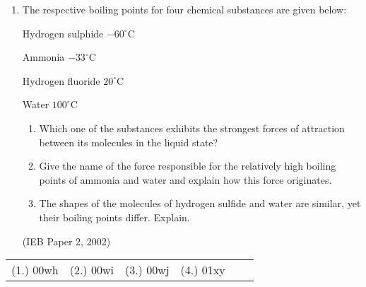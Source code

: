 \begin{eocexercises}{}
\begin{enumerate}
\item{The respective boiling points for four chemical substances are given below:

Hydrogen sulphide $-60^{\circ}$C

Ammonia $-33^{\circ}$C

Hydrogen fluoride $20^{\circ}$C

Water $100^{\circ}$C

\begin{enumerate}
\item{Which one of the substances exhibits the strongest forces of attraction between its molecules in the liquid state?}
\item{Give the name of the force responsible for the relatively high boiling points of ammonia and water and explain how this force originates.}
\item{The shapes of the molecules of hydrogen sulfide and water are similar, yet their boiling points differ. Explain.}
\end{enumerate}

}
(IEB Paper 2, 2002)
\end{enumerate}

\practiceinfo

\begin{tabular}[h]{cccccc}
(1.) 00wh & (2.) 00wi & (3.) 00wj & (4.) 01xy
 \end{tabular}
\end{eocexercises}






